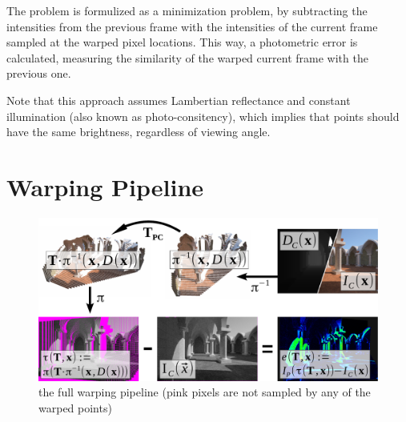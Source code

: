 The problem is formulized as a minimization problem, by subtracting the
intensities from the previous frame with the intensities of the current frame
sampled at the warped pixel locations. This way, a photometric error is
calculated, measuring the similarity of the warped current frame with the
previous one.

Note that this approach assumes Lambertian reflectance and constant
illumination (also known as photo-consitency), which implies that points should
have the same brightness, regardless of viewing angle.


\section{Warping Pipeline}

\begin{figure}[h]
    \centering
    \includegraphics[width=\textwidth]{images/warp_pipeline.pdf}
    \caption{the full warping pipeline (pink pixels are not sampled by any of the warped points)}
    \label{fig:warp_pipeline}
\end{figure}

